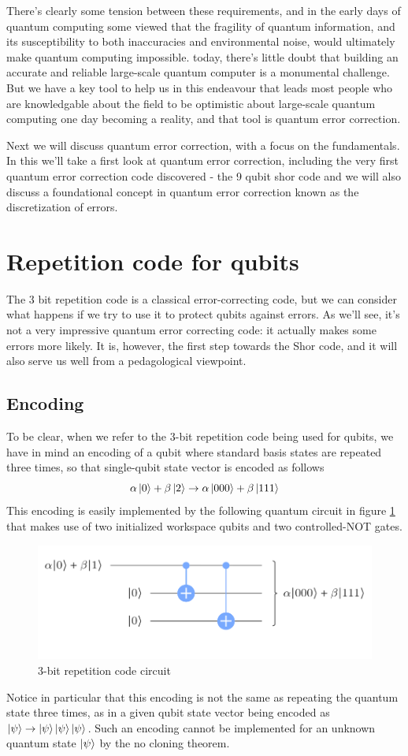 \documentclass[12pt, oneside]{book}
\theoremstyle{definition}
\theoremstyle{definition}
\theoremstyle{remark}
\begin{document}
There's clearly some tension between these requirements, and in the early days of quantum computing some viewed that the fragility of quantum information, and its susceptibility to both inaccuracies and environmental noise, would ultimately make quantum computing impossible. today, there's little doubt that building an accurate and reliable large-scale quantum computer is a monumental challenge. But we have a key tool to help us in this endeavour that leads most people who are knowledgable about the field to be optimistic about large-scale quantum computing one day becoming a reality, and that tool is quantum error correction.

Next we will discuss quantum error correction, with a focus on the fundamentals. In this we'll take a first look at quantum error correction, including the very first quantum error correction code discovered - the 9 qubit shor code and we will also discuss a foundational concept in quantum error correction known as the discretization of errors.

\section{Repetition code for qubits}
The $3$ bit repetition code is a classical error-correcting code, but we can consider what happens if we try to use it to protect qubits against errors. As we'll see, it's not a very impressive quantum error correcting code: it actually makes some errors more likely. It is, however, the first step towards the Shor code, and it will also serve us well from a pedagological viewpoint.

\subsection{Encoding}
To be clear, when we refer to the $3$-bit repetition code being used for qubits, we have in mind an encoding of a qubit where standard basis states are repeated three times, so that single-qubit state vector is encoded as follows
\[
\alpha\ket{0}+\beta\ket{2}\rightarrow \alpha\ket{000}+\beta\ket{111}
\]
This encoding is easily implemented by the following quantum circuit in figure \ref{fig:3bitrepcirc} that makes use of two initialized workspace qubits and two controlled-NOT gates.
\begin{figure}[ht]
    \centering
    \includegraphics[width=0.75\linewidth]{Images/bitflipprep.png}
    \caption{3-bit repetition code circuit}
    \label{fig:3bitrepcirc}
\end{figure}
Notice in particular that this encoding is not the same as repeating the quantum state three times, as in a given qubit state vector being encoded as $\ket{\psi}\rightarrow \ket{\psi}\ket{\psi}\ket{\psi}$. Such an encoding cannot be implemented for an unknown quantum state $\ket{\psi}$ by the no cloning theorem.
\end{document}
